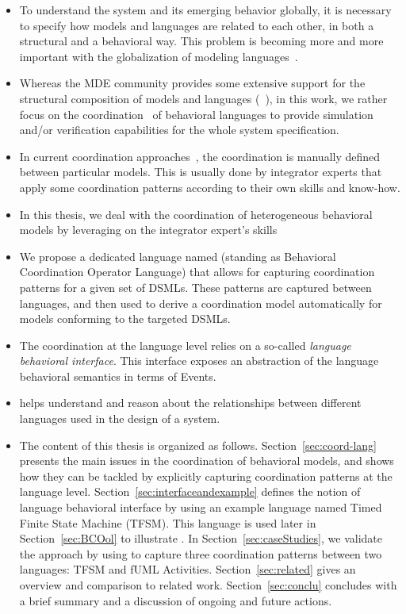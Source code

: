 \begin{itemize}
	\item To understand the system and its emerging behavior globally, it is necessary to specify how models and languages are related to each other, in both a structural and a behavioral way. This problem is becoming more and more important with the globalization of modeling languages~\cite{gemoccolum}.
	
	\item Whereas the MDE community provides some extensive support for the structural composition of models and languages (\eg~\cite{kompose,epsilon}), in this work, we rather focus on the coordination~\cite{coordlangandsigni} of behavioral languages to provide simulation and/or verification capabilities for the whole system specification. 
	
	\item In current coordination approaches~\cite{coordlangandsigni,rapide,esperbib,varalarsen:gemoc13}, the coordination is manually defined between particular models. This is usually done by integrator experts that apply some coordination patterns according to their own skills and know-how.
	
	
	 \item In this thesis, we deal with the coordination of heterogeneous behavioral models by leveraging on the integrator expert's skills 
	 
	 \item We propose a dedicated language named \bcool (standing as Behavioral Coordination Operator Language) that allows for capturing coordination patterns for a given set of DSMLs. These patterns are captured between languages, and then used to derive a coordination model automatically for models conforming to the targeted DSMLs. 
	 
	 \item The coordination at the language level relies on a so-called \emph{language behavioral interface}. This interface exposes an abstraction of the language behavioral semantics in terms of Events. 
	 
	 \item \bcool helps understand and reason about the relationships between different languages used in the design of a system. 
	
	
	
	\item The content of this thesis is organized as follows. Section~\ref{sec:coord-lang} presents the main issues in the coordination of behavioral models, and shows how they can be tackled by explicitly capturing coordination patterns at the language level. Section~\ref{sec:interfaceandexample} defines the notion of language behavioral interface by using an example language named Timed Finite State Machine (TFSM). This language is used later in Section~\ref{sec:BCOol} to illustrate \bcool. In Section~\ref{sec:caseStudies}, we validate the approach by using \bcool to capture three coordination patterns between two languages: TFSM and fUML Activities. Section~\ref{sec:related} gives an overview and comparison to related work. Section~\ref{sec:conclu} concludes with a brief summary and a discussion of ongoing and future actions.
	

\end{itemize}
